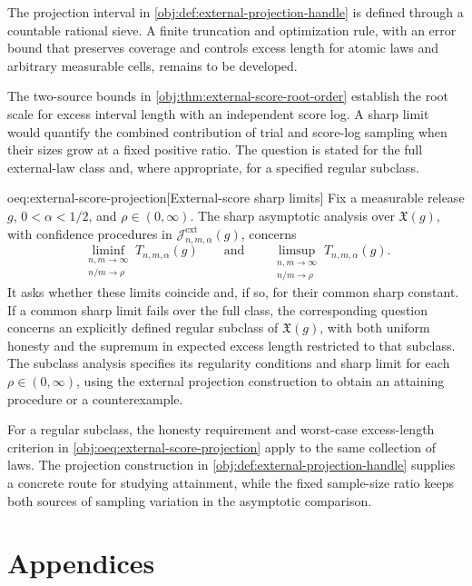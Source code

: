 \documentclass[11pt]{article}
\begin{document}
The projection interval in \cref{obj:def:external-projection-handle} is defined through a countable rational sieve. A finite truncation and optimization rule, with an error bound that preserves coverage and controls excess length for atomic laws and arbitrary measurable cells, remains to be developed.

The two-source bounds in \cref{obj:thm:external-score-root-order} establish the root scale for excess interval length with an independent score log. A sharp limit would quantify the combined contribution of trial and score-log sampling when their sizes grow at a fixed positive ratio. The question is stated for the full external-law class and, where appropriate, for a specified regular subclass.

\begin{remarkv}{oeq:external-score-projection}[External-score sharp limits]
Fix a measurable release \(g\), \(0<\alpha<1/2\), and \(\rho\in(0,\infty)\). The sharp asymptotic analysis over \(\mathfrak X(g)\), with confidence procedures in \(\mathcal J^{\mathrm{ext}}_{n,m,\alpha}(g)\), concerns
\[
\liminf_{\substack{n,m\to\infty\\ n/m\to\rho}}T_{n,m,\alpha}(g)
\qquad\text{and}\qquad
\limsup_{\substack{n,m\to\infty\\ n/m\to\rho}}T_{n,m,\alpha}(g).
\]
It asks whether these limits coincide and, if so, for their common sharp constant. If a common sharp limit fails over the full class, the corresponding question concerns an explicitly defined regular subclass of \(\mathfrak X(g)\), with both uniform honesty and the supremum in expected excess length restricted to that subclass. The subclass analysis specifies its regularity conditions and sharp limit for each \(\rho\in(0,\infty)\), using the external projection construction to obtain an attaining procedure or a counterexample.
\end{remarkv}

For a regular subclass, the honesty requirement and worst-case excess-length criterion in \cref{obj:oeq:external-score-projection} apply to the same collection of laws. The projection construction in \cref{obj:def:external-projection-handle} supplies a concrete route for studying attainment, while the fixed sample-size ratio keeps both sources of sampling variation in the asymptotic comparison.


\appendix

\section*{Appendices}
\end{document}
